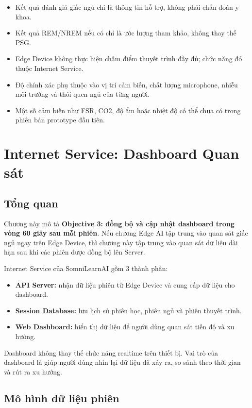 \documentclass[12pt,a4paper]{article}
\begin{document}
\begin{itemize}
    \item Kết quả đánh giá giấc ngủ chỉ là thông tin hỗ trợ, không phải chẩn đoán y khoa.
    \item Kết quả REM/NREM nếu có chỉ là ước lượng tham khảo, không thay thế PSG.
    \item Edge Device không thực hiện chấm điểm thuyết trình đầy đủ; chức năng đó thuộc Internet Service.
    \item Độ chính xác phụ thuộc vào vị trí cảm biến, chất lượng microphone, nhiễu môi trường và thói quen ngủ của từng người.
    \item Một số cảm biến như FSR, CO2, độ ẩm hoặc nhiệt độ có thể chưa có trong phiên bản prototype đầu tiên.
\end{itemize}

\newpage
\section{Internet Service: Dashboard Quan sát}

\subsection{Tổng quan}

Chương này mô tả \textbf{Objective 3: đồng bộ và cập nhật dashboard trong vòng 60 giây sau mỗi phiên}. Nếu chương Edge AI tập trung vào quan sát giấc ngủ ngay trên Edge Device, thì chương này tập trung vào quan sát dữ liệu dài hạn sau khi các phiên được đồng bộ lên Server.

Internet Service của SomniLearnAI gồm 3 thành phần:

\begin{itemize}
    \item \textbf{API Server:} nhận dữ liệu phiên từ Edge Device và cung cấp dữ liệu cho dashboard.
    \item \textbf{Session Database:} lưu lịch sử phiên học, phiên ngủ và phiên thuyết trình.
    \item \textbf{Web Dashboard:} hiển thị dữ liệu để người dùng quan sát tiến độ và xu hướng.
\end{itemize}

Dashboard không thay thế chức năng realtime trên thiết bị. Vai trò của dashboard là giúp người dùng nhìn lại dữ liệu đã xảy ra, so sánh theo thời gian và rút ra xu hướng.

\subsection{Mô hình dữ liệu phiên}
\end{document}
